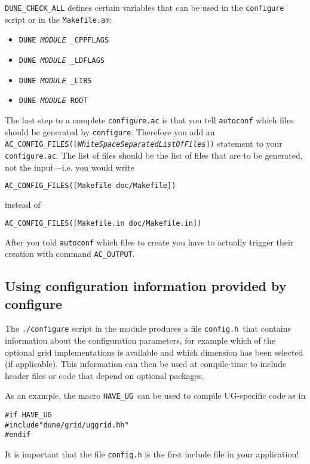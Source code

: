 \documentclass[11pt,a4paper,headinclude,footinclude,DIV16,normalheadings]{scrartcl}
\newcommand{\autoconf}{\texttt{autoconf}\xspace}
\newcommand{\configure}{\texttt{configure}\xspace}
\newcommand{\configureac}{\texttt{configure.ac}\xspace}
\newcommand{\makefileam}{\texttt{Makefile.am}\xspace}
\begin{document}
\texttt{DUNE\_CHECK\_ALL} defines certain
variables that can be used in the \configure script or in the
\makefileam:

\begin{itemize}
\item \texttt{DUNE\textit{\,MODULE\,}\_CPPFLAGS}
\item \texttt{DUNE\textit{\,MODULE\,}\_LDFLAGS}
\item \texttt{DUNE\textit{\,MODULE\,}\_LIBS}
\item \texttt{DUNE\textit{\,MODULE\,}ROOT}
\end{itemize}

The last step to a complete \configureac is that you tell \autoconf
which files should be generated by \configure. Therefore you add an
\texttt{AC\_CONFIG\_FILES([\textit{WhiteSpaceSeparatedListOfFiles}])}
statement to your \configureac. The list of files should be the list
of files that are to be generated, not the input---i.e. you would
write
\begin{lstlisting}[language=make]
AC_CONFIG_FILES([Makefile doc/Makefile])
\end{lstlisting}
instead of
\begin{lstlisting}[language=make]
AC_CONFIG_FILES([Makefile.in doc/Makefile.in])
\end{lstlisting}
After you told \autoconf which files to create you have to actually
trigger their creation with command \texttt{AC\_OUTPUT}.

\subsection{Using configuration information provided by configure}

The \lstinline!./configure! script in the module produces a file
\lstinline!config.h!\ that contains information about the configuration
parameters, for example which of the optional grid implementations is
available and which dimension has been selected (if applicable). This
information can then be used at compile-time to include header files
or code that depend on optional packages.

As an example, the macro \lstinline!HAVE_UG!\ can be used to compile
UG-specific code as in
\begin{lstlisting}[basicstyle=\ttfamily\scriptsize]
#if HAVE_UG
#include"dune/grid/uggrid.hh"
#endif
\end{lstlisting}

It is important that the file \lstinline!config.h! is the first
include file in your application!
\end{document}
